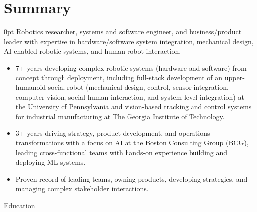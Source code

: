 \documentclass[10pt, letter]{article}
\begin{document}


\section*{Summary}

\begin{adjustwidth}{\cvindent}{0pt}
Robotics researcher, systems and software engineer, and business/product leader with  expertise in hardware/software system integration, mechanical design, AI-enabled robotic systems, and human robot interaction.
\begin{itemize}
    \item 7+ years developing complex robotic systems (hardware and software) from concept through deployment, including full-stack development of an upper-humanoid social robot (mechanical design,  control, sensor integration, computer vision,  social human interaction, and system-level integration) at the University of Pennsylvania and vision-based tracking and control systems for industrial manufacturing at The Georgia Institute of Technology.
    \item 3+ years driving strategy, product development, and operations transformations with a focus on AI at the Boston Consulting Group (BCG), leading cross-functional teams with hands-on experience building and deploying ML systems.
    \item Proven record of leading teams, owning products, developing strategies, and managing complex stakeholder interactions.
\end{itemize}

\end{adjustwidth}




\begin{cvsection}{Education}




\end{cvsection}
\end{document}
